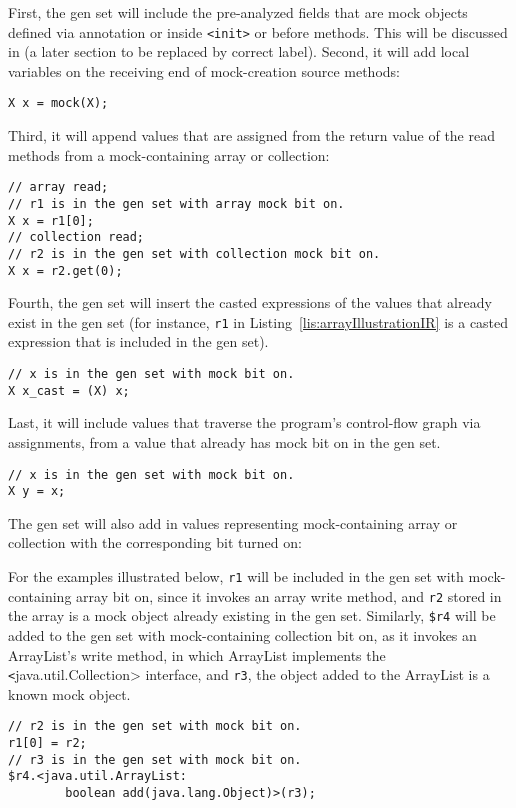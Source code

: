 First, the gen set will include the pre-analyzed fields that are mock objects defined via annotation or inside \texttt{<init>} or before methods. This will be discussed in (a later section to be replaced by correct label). Second, it will add local variables on the receiving end of mock-creation source methods:
\begin{lstlisting}[basicstyle=\ttfamily\small,numbers=none]
X x = mock(X);
\end{lstlisting}
Third, it will append values that are assigned from the return value of the read methods from a mock-containing array or collection:
\begin{lstlisting}[basicstyle=\ttfamily\small,numbers=none]
// array read;
// r1 is in the gen set with array mock bit on.
X x = r1[0];
// collection read;
// r2 is in the gen set with collection mock bit on.
X x = r2.get(0);
\end{lstlisting}
Fourth, the gen set will insert the casted expressions of the values that already exist in the gen set (for instance, \texttt{r1} in Listing~\ref{lis:arrayIllustrationIR} is a casted expression that is included in the gen set).
\begin{lstlisting}[basicstyle=\ttfamily\small,numbers=none]
// x is in the gen set with mock bit on.
X x_cast = (X) x;
\end{lstlisting}

Last, it will include values that traverse the program's control-flow graph via assignments, from a value that already has mock bit on in the gen set.
\begin{lstlisting}[basicstyle=\ttfamily\small,numbers=none]
// x is in the gen set with mock bit on.
X y = x;
\end{lstlisting}

The gen set will also add in values representing mock-containing array or collection with the corresponding bit turned on:

For the examples illustrated below, \texttt{r1} will be included in the gen set with mock-containing array bit on, since it invokes an array write method, and \texttt{r2} stored in the array is a mock object already existing in the gen set. Similarly, \texttt{\$r4} will be added to the gen set with mock-containing collection bit on, as it invokes an ArrayList's write method, in which ArrayList implements the \texttt<java.util.Collection> interface, and \texttt{r3}, the object added to the ArrayList is a known mock object.
\begin{lstlisting}[basicstyle=\ttfamily\small,numbers=none]
// r2 is in the gen set with mock bit on.
r1[0] = r2;
// r3 is in the gen set with mock bit on.
$r4.<java.util.ArrayList: 
		boolean add(java.lang.Object)>(r3);
\end{lstlisting}

